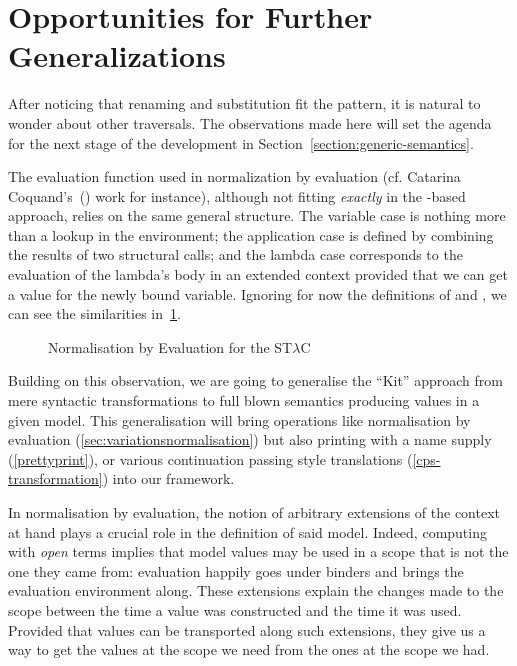 \section{Opportunities for Further Generalizations}

After noticing that renaming and substitution fit the pattern, it is
natural to wonder about other traversals. The observations made here
will set the agenda for the next stage of the development in
Section~\ref{section:generic-semantics}.

The evaluation function used in normalization by evaluation
(cf. Catarina Coquand's~(\citeyear{coquand2002formalised}) work
for instance), although
not fitting \emph{exactly} in the -based approach, relies on
the same general structure. The variable case is nothing more than a
lookup in the environment; the application case is defined by combining
the results of two structural calls; and the lambda case corresponds to
the evaluation of the lambda's body in an extended context provided that
we can get a value for the newly bound variable. Ignoring for now the
definitions of  and , we can see the similarities
in~\cref{nbe}.

\begin{figure}[h]
\caption{Normalisation by Evaluation for the ST$λ$C\label{nbe}}
\end{figure}

Building on this observation, we are going to generalise the ``Kit''
approach from mere syntactic transformations to full blown semantics
producing values in a given model. This generalisation will bring
operations like
normalisation by evaluation (\cref{sec:variationsnormalisation})
but also printing with a name supply (\cref{prettyprint}),
or various continuation passing style translations (\cref{cps-transformation})
into our framework.

In normalisation by evaluation, the notion of arbitrary extensions of
the context at hand plays a crucial role in the definition of said model.
Indeed, computing with \emph{open} terms implies that model values may be
used in a scope that is not the one they came from: evaluation happily goes
under binders and brings the evaluation environment along.
%
These extensions explain the changes made to the scope between the time a
value was constructed and the time it was used. Provided that values can be
transported along such extensions, they give us a way to get the values at
the scope we need from the ones at the scope we had.

